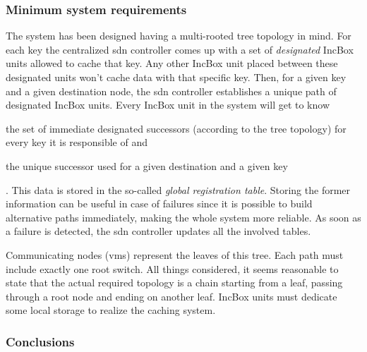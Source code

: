 \subsubsection{Minimum system requirements}
The system has been designed having a multi-rooted tree topology in mind.
For each key the centralized \gls{sdn} controller comes up with a set of \textit{designated} IncBox units allowed to cache that key.
Any other IncBox unit placed between these designated units won't cache data with that specific key.
Then, for a given key and a given destination node, the \gls{sdn} controller establishes a unique path of designated IncBox units.
Every IncBox unit in the system will get to know
\begin{mylist}
    \item the set of immediate designated successors (according to the tree topology) for every key it is responsible of and
    \item the unique successor used for a given destination and a given key
\end{mylist}.
This data is stored in the so-called \textit{global registration table}.
Storing the former information can be useful in case of failures since it is possible to build alternative paths immediately, making the whole system more reliable.
As soon as a failure is detected, the \gls{sdn} controller updates all the involved tables.\par
Communicating nodes (\glspl{vm}) represent the leaves of this tree.
Each path must include exactly one root switch.
All things considered, it seems reasonable to state that the actual required topology is a chain starting from a leaf, passing through a root node and ending on another leaf.
IncBox units must dedicate some local storage to realize the caching system.

\subsubsection{Conclusions}
